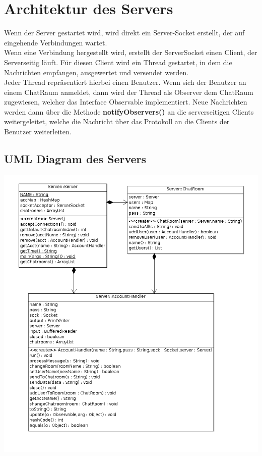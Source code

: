 \documentclass[a4paper, oneside]{scrreprt}
\begin{document}
\chapter{Architektur des Servers}
Wenn der Server gestartet wird, wird direkt ein Server-Socket erstellt, der auf eingehende Verbindungen wartet. \\
Wenn eine Verbindung hergestellt wird, erstellt der ServerSocket einen Client, der Serverseitig läuft. Für diesen Client wird ein Thread gestartet, in dem die Nachrichten empfangen, ausgewertet und versendet werden. \\
Jeder Thread repräsentiert hierbei einen Benutzer. Wenn sich der Benutzer an einem ChatRaum anmeldet, dann wird der Thread als Observer dem ChatRaum zugewiesen, welcher das Interface Observable implementiert. Neue Nachrichten werden dann über die Methode \textbf{notifyObservers()} an die serverseitigen Clients weitergeleitet, welche die Nachricht über das Protokoll an die Clients der Benutzer weiterleiten.\\

\section{UML Diagram des Servers}

\includegraphics[scale=0.6]{data/RNPA2Server.png}
\end{document}
